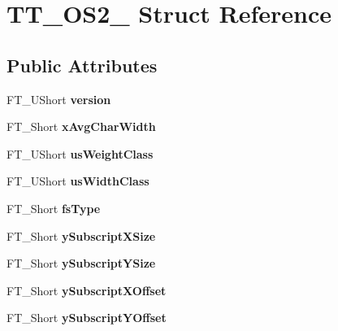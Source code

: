 \hypertarget{structTT__OS2__}{}\section{T\+T\+\_\+\+O\+S2\+\_\+ Struct Reference}
\label{structTT__OS2__}
\subsection*{Public Attributes}
\begin{DoxyCompactItemize}
\item 
\mbox{\label{structTT__OS2___a012ff79224cd25ae51837ca8937605c4}} 
F\+T\+\_\+\+U\+Short {\bfseries version}
\item 
\mbox{\label{structTT__OS2___af903883918479780d17a72f6fee992bd}} 
F\+T\+\_\+\+Short {\bfseries x\+Avg\+Char\+Width}
\item 
\mbox{\label{structTT__OS2___af4d8ab32a27382ea95b882d9e2615ec9}} 
F\+T\+\_\+\+U\+Short {\bfseries us\+Weight\+Class}
\item 
\mbox{\label{structTT__OS2___a8ef38b9f9c65a65aa6abf92e19236146}} 
F\+T\+\_\+\+U\+Short {\bfseries us\+Width\+Class}
\item 
\mbox{\label{structTT__OS2___a8c37e3fa40954af5e5f9206eb6631eb7}} 
F\+T\+\_\+\+Short {\bfseries fs\+Type}
\item 
\mbox{\label{structTT__OS2___a3ae8d803a5055564e9f8a3926200e39c}} 
F\+T\+\_\+\+Short {\bfseries y\+Subscript\+X\+Size}
\item 
\mbox{\label{structTT__OS2___afb1b8ed1ea98badd4de58ff47b54c4c2}} 
F\+T\+\_\+\+Short {\bfseries y\+Subscript\+Y\+Size}
\item 
\mbox{\label{structTT__OS2___ab471c53b6e8a1c1f81cc410959bb5851}} 
F\+T\+\_\+\+Short {\bfseries y\+Subscript\+X\+Offset}
\item 
\mbox{\label{structTT__OS2___a94902b1f33ded0ea4c0555d54a0750fa}} 
F\+T\+\_\+\+Short {\bfseries y\+Subscript\+Y\+Offset}

\end{DoxyCompactItemize}
